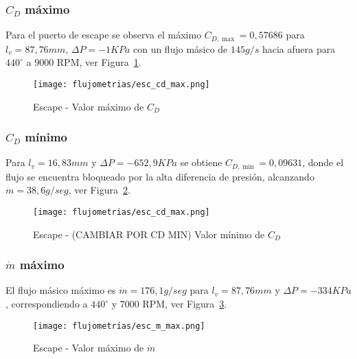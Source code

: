 \subsubsection{$C_{D}$ máximo}
%
Para el puerto de escape se observa el máximo $C_{D,\max}=0,57686$ para
$l_{v}=87,76 mm$, $\Delta P=-1 KPa$ con un flujo másico de $145 g/s$ hacia
afuera para $440^{\circ}$ a $9000$ RPM, ver Figura~\ref{fig:esc_cd_max}.

\begin{figure}[ht]
    \centering
    \texttt{[image: flujometrias/esc\_cd\_max.png]}
    \caption{Escape - Valor máximo de $C_{D}$}\label{fig:esc_cd_max}
\end{figure}

\subsubsection{$C_{D}$ mínimo}
%
Para $l_{v}=16,83 mm$ y $\Delta P=-652,9 KPa$ se obtiene $C_{D, \min}=0,09631$,
donde el flujo se encuentra bloqueado por la alta diferencia de presión,
alcanzando $\dot{m}=38,6 g/seg$, ver Figura~\ref{fig:esc_cd_min}.

\begin{figure}[ht]
    \centering
    \texttt{[image: flujometrias/esc\_cd\_max.png]}
    \caption{Escape - (CAMBIAR POR CD MIN) Valor mínimo de $C_{D}$}\label{fig:esc_cd_min}
\end{figure}

\subsubsection{$\dot{m}$ máximo}
%
El flujo másico máximo es $\dot{m}=176,1 g/seg$ para $l_{v}=87,76 mm$ y
$\Delta P=-334 KPa$, correspondiendo a $440^{\circ}$ y 7000 RPM,
ver Figura~\ref{fig:esc_m_max}.

\begin{figure}[ht]
    \centering
    \texttt{[image: flujometrias/esc\_m\_max.png]}
    \caption{Escape - Valor máximo de $\dot{m}$}\label{fig:esc_m_max}
\end{figure}
